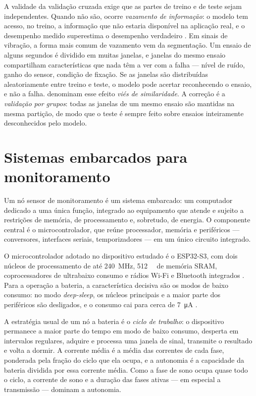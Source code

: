 A validade da validação cruzada exige que as partes de treino e de teste sejam
independentes. Quando não são, ocorre \emph{vazamento de informação}: o modelo tem acesso,
no treino, a informação que não estaria disponível na aplicação real, e o desempenho
medido superestima o desempenho verdadeiro \cite{kaufman2012}. Em sinais de vibração, a
forma mais comum de vazamento vem da segmentação. Um ensaio de alguns segundos é dividido em
muitas janelas, e janelas do mesmo ensaio compartilham características que nada têm a ver
com a falha --- nível de ruído, ganho do sensor, condição de fixação. Se as janelas são
distribuídas aleatoriamente entre treino e teste, o modelo pode acertar reconhecendo o
ensaio, e não a falha.  denominam esse efeito \emph{viés de
similaridade}. A correção é a \emph{validação por grupos}: todas as janelas de um mesmo
ensaio são mantidas na mesma partição, de modo que o teste é sempre feito sobre ensaios
inteiramente desconhecidos pelo modelo.

\section{Sistemas embarcados para monitoramento}
\label{sec:fund-embarcados}

Um nó sensor de monitoramento é um sistema embarcado: um computador dedicado a uma única
função, integrado ao equipamento que atende e sujeito a restrições de memória, de
processamento e, sobretudo, de energia. O componente central é o microcontrolador, que
reúne processador, memória e periféricos --- conversores, interfaces seriais, temporizadores
--- em um único circuito integrado.

O microcontrolador adotado no dispositivo estudado é o ESP32-S3, com dois núcleos de
processamento de até \SI{240}{\mega\hertz}, \SI{512}{\kilo\byte} de memória SRAM,
coprocessadores de ultrabaixo consumo e rádios Wi-Fi e Bluetooth integrados
\cite{espressif2026}. Para a operação a bateria, a característica decisiva são os modos de
baixo consumo: no modo \emph{deep-sleep}, os núcleos principais e a maior parte dos
periféricos são desligados, e o consumo cai para cerca de \SI{7}{\micro\ampere}
\cite{espressif2026}.

A estratégia usual de um nó a bateria é o \emph{ciclo de trabalho}: o dispositivo permanece
a maior parte do tempo em modo de baixo consumo, desperta em intervalos regulares, adquire
e processa uma janela de sinal, transmite o resultado e volta a dormir. A corrente média
é a média das correntes de cada fase, ponderada pela fração do ciclo que ela ocupa, e a
autonomia é a capacidade da bateria dividida por essa corrente média. Como a fase de sono
ocupa quase todo o ciclo, a corrente de sono e a duração das fases ativas --- em especial a
transmissão --- dominam a autonomia.

